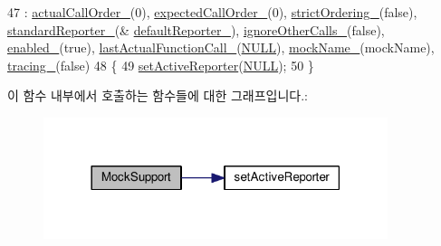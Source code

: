 \begin{DoxyCode}
47     : \hyperlink{class_mock_support_a58e873078e053e6b06ad68a8a7e0c313}{actualCallOrder\_}(0), \hyperlink{class_mock_support_afa5b7a7d70e8552f039255ae1d85f215}{expectedCallOrder\_}(0), 
      \hyperlink{class_mock_support_aeabf06d13371d5bbf5663b47374d9ebb}{strictOrdering\_}(\textcolor{keyword}{false}), \hyperlink{class_mock_support_a6df54f7f57d625cc6c06c838e37c76c0}{standardReporter\_}(&
      \hyperlink{class_mock_support_a6af0203dcca7655959d71608423a6bfc}{defaultReporter\_}), \hyperlink{class_mock_support_a5a3b2bc086fdd2ca5aae69b37ea70942}{ignoreOtherCalls\_}(\textcolor{keyword}{false}), 
      \hyperlink{class_mock_support_ab6dfcb3e6c79f4def1295fea7f0de8c0}{enabled\_}(\textcolor{keyword}{true}), \hyperlink{class_mock_support_aadd48976efe51d36597ebe298e6b9233}{lastActualFunctionCall\_}(\hyperlink{openavb__types__base__pub_8h_a070d2ce7b6bb7e5c05602aa8c308d0c4}{NULL}), 
      \hyperlink{class_mock_support_a4ab891b797dea40dc832515765d4ab3e}{mockName\_}(mockName), \hyperlink{class_mock_support_a37e443d21e04cf8d6c14d46013cdafdb}{tracing\_}(\textcolor{keyword}{false})
48 \{
49     \hyperlink{class_mock_support_a5b30c782d3cc89d851f6ca446e3bcfbf}{setActiveReporter}(\hyperlink{openavb__types__base__pub_8h_a070d2ce7b6bb7e5c05602aa8c308d0c4}{NULL});
50 \}
\end{DoxyCode}


이 함수 내부에서 호출하는 함수들에 대한 그래프입니다.\+:
\nopagebreak
\begin{figure}[H]
\begin{center}
\leavevmode
\includegraphics[width=285pt]{class_mock_support_a18c663f1f5ef64aaa5bb968c5d3a731f_cgraph}
\end{center}
\end{figure}




